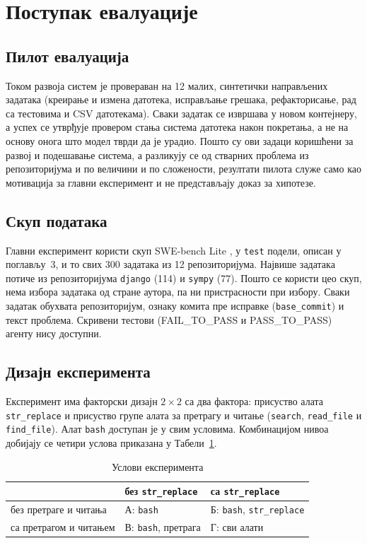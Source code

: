 \documentclass[12pt,a4paper]{report}
\newcommand{\tabelalevo}{\setstretch{1}\fontsize{11bp}{14.5bp}\selectfont
	\hspace*{\dimexpr-\tabcolsep-\arrayrulewidth+0.4bp\relax}}
\begin{document}
	\section{Поступак евалуације}

	\subsection{Пилот евалуација}

	Током развоја систем је провераван на 12 малих, синтетички направљених
	задатака (креирање и измена датотека, исправљање грешака, рефакторисање,
	рад са тестовима и CSV датотекама). Сваки задатак се извршава у новом
	контејнеру, а успех се утврђује провером стања система датотека након
	покретања, а не на основу онога што модел тврди да је урадио. Пошто су ови
	задаци коришћени за развој и подешавање система, а разликују се од стварних
	проблема из репозиторијума и по величини и по сложености, резултати пилота
	служе само као мотивација за главни експеримент и не представљају доказ за
	хипотезе.

	\subsection{Скуп података}

	Главни експеримент користи скуп SWE-bench Lite
	\parencite{jimenez2024swebench}, у \texttt{test} подели, описан у поглављу~3, и то свих 300 задатака из 12 репозиторијума. Највише
	задатака потиче из репозиторијума \texttt{django} (114) и \texttt{sympy}
	(77). Пошто се користи цео скуп, нема избора задатака од стране аутора, па
	ни пристрасности при избору. Сваки задатак обухвата репозиторијум, ознаку
	комита пре исправке (\texttt{base\_commit}) и текст проблема. Скривени
	тестови (FAIL\_TO\_PASS и PASS\_TO\_PASS) агенту нису доступни.

	\subsection{Дизајн експеримента}

	Експеримент има факторски дизајн $2 \times 2$ са два фактора: присуство
	алата \texttt{str\_replace} и присуство групе алата за претрагу и читање
	(\texttt{search}, \texttt{read\_file} и \texttt{find\_file}). Алат
	\texttt{bash} доступан је у свим условима. Комбинацијом нивоа добијају се
	четири услова приказана у Табели~\ref{tab:uslovi}.

	\begin{table}[H]
		\caption{Услови експеримента}
		\label{tab:uslovi}
		\tabelalevo
		\begin{tabular}{|l|l|l|}
			\hline
			& без \texttt{str\_replace} & са \texttt{str\_replace} \\
			\hline
			без претраге и читања & А: \texttt{bash} & Б: \texttt{bash}, \texttt{str\_replace} \\
			\hline
			са претрагом и читањем & В: \texttt{bash}, претрага & Г: сви алати \\
			\hline
		\end{tabular}
	\end{table}
\end{document}

